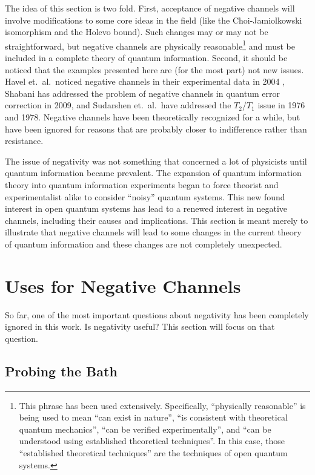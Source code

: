 The idea of this section is two fold.  First, acceptance of negative channels will involve modifications to some core ideas in the field (like the Choi-Jamiolkowski isomorphism and the Holevo bound).  Such changes may or may not be straightforward, but negative channels are physically reasonable\footnote{This phrase has been used extensively.  Specifically, ``physically reasonable'' is being used to mean ``can exist in nature'', ``is consistent with theoretical quantum mechanics'', ``can be verified experimentally'', and ``can be understood using established theoretical techniques''.  In this case, those ``established theoretical techniques'' are the techniques of open quantum systems.} and must be included in a complete theory of quantum information.  Second, it should be noticed that the examples presented here are (for the most part) not new issues.  Havel et.\ al.\ noticed negative channels in their experimental data in 2004 \cite{Havel2003}, Shabani has addressed the problem of negative channels in quantum error correction in 2009, and Sudarshen et.\ al.\ have addressed the $T_2$/$T_1$ issue in 1976 and 1978.  Negative channels have been theoretically recognized for a while, but have been ignored for reasons that are probably closer to indifference rather than resistance.  

The issue of negativity was not something that concerned a lot of physicists until quantum information became prevalent.  The expansion of quantum information theory into quantum information experiments began to force theorist and experimentalist alike to consider ``noisy'' quantum systems.  This new found interest in open quantum systems has lead to a renewed interest in negative channels, including their causes and implications.  This section is meant merely to illustrate that negative channels will lead to some changes in the current theory of quantum information and these changes are not completely unexpected.

\section{Uses for Negative Channels}

So far, one of the most important questions about negativity has been completely ignored in this work.  Is negativity useful?  This section will focus on that question.

\subsection{Probing the Bath}
